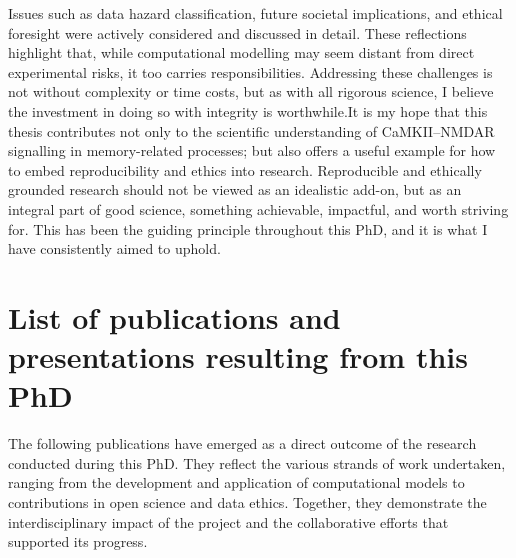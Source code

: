 \documentclass[
  11pt,
  letterpaper,
]{scrreprt}
\begin{document}
Issues such as data hazard classification, future societal implications,
and ethical foresight were actively considered and discussed in detail.
These reflections highlight that, while computational modelling may seem
distant from direct experimental risks, it too carries responsibilities.
Addressing these challenges is not without complexity or time costs, but
as with all rigorous science, I believe the investment in doing so with
integrity is worthwhile.It is my hope that this thesis contributes not
only to the scientific understanding of CaMKII--NMDAR signalling in
memory-related processes; but also offers a useful example for how to
embed reproducibility and ethics into research. Reproducible and
ethically grounded research should not be viewed as an idealistic
add-on, but as an integral part of good science, something achievable,
impactful, and worth striving for. This has been the guiding principle
throughout this PhD, and it is what I have consistently aimed to uphold.


\chapter{List of publications and presentations resulting from this
PhD}\label{list-of-publications-and-presentations-resulting-from-this-phd}

The following publications have emerged as a direct outcome of the
research conducted during this PhD. They reflect the various strands of
work undertaken, ranging from the development and application of
computational models to contributions in open science and data ethics.
Together, they demonstrate the interdisciplinary impact of the project
and the collaborative efforts that supported its progress.
\end{document}
